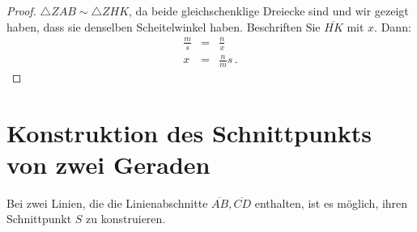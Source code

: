 \begin{proof}
$\triangle ZAB\sim\triangle ZHK$, da beide gleichschenklige Dreiecke sind und wir gezeigt haben, dass sie denselben Scheitelwinkel haben. Beschriften Sie $\overline{HK}$ mit $x$. Dann:
\begin{eqnarray*}
\frac{m}{s} &=& \frac{n}{x}\\
x&=&\frac{n}{m}s\,.
\end{eqnarray*}
\end{proof}


\section{Konstruktion des Schnittpunkts von zwei Geraden}\label{s.two-lines}

\begin{theorem}
Bei zwei Linien, die die Linienabschnitte $\overline{AB}, \overline{CD}$ enthalten, ist es möglich, ihren Schnittpunkt $S$ zu konstruieren.
\end{theorem}

